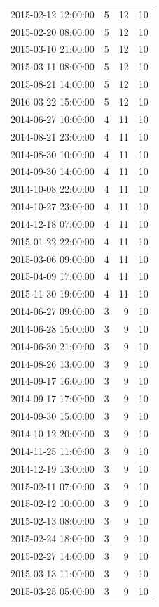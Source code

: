 \begin{tabular}{lrrr}
2015-02-12 12:00:00 & 5 & 12 & 10 \\
2015-02-20 08:00:00 & 5 & 12 & 10 \\
2015-03-10 21:00:00 & 5 & 12 & 10 \\
2015-03-11 08:00:00 & 5 & 12 & 10 \\
2015-08-21 14:00:00 & 5 & 12 & 10 \\
2016-03-22 15:00:00 & 5 & 12 & 10 \\
2014-06-27 10:00:00 & 4 & 11 & 10 \\
2014-08-21 23:00:00 & 4 & 11 & 10 \\
2014-08-30 10:00:00 & 4 & 11 & 10 \\
2014-09-30 14:00:00 & 4 & 11 & 10 \\
2014-10-08 22:00:00 & 4 & 11 & 10 \\
2014-10-27 23:00:00 & 4 & 11 & 10 \\
2014-12-18 07:00:00 & 4 & 11 & 10 \\
2015-01-22 22:00:00 & 4 & 11 & 10 \\
2015-03-06 09:00:00 & 4 & 11 & 10 \\
2015-04-09 17:00:00 & 4 & 11 & 10 \\
2015-11-30 19:00:00 & 4 & 11 & 10 \\
2014-06-27 09:00:00 & 3 & 9 & 10 \\
2014-06-28 15:00:00 & 3 & 9 & 10 \\
2014-06-30 21:00:00 & 3 & 9 & 10 \\
2014-08-26 13:00:00 & 3 & 9 & 10 \\
2014-09-17 16:00:00 & 3 & 9 & 10 \\
2014-09-17 17:00:00 & 3 & 9 & 10 \\
2014-09-30 15:00:00 & 3 & 9 & 10 \\
2014-10-12 20:00:00 & 3 & 9 & 10 \\
2014-11-25 11:00:00 & 3 & 9 & 10 \\
2014-12-19 13:00:00 & 3 & 9 & 10 \\
2015-02-11 07:00:00 & 3 & 9 & 10 \\
2015-02-12 10:00:00 & 3 & 9 & 10 \\
2015-02-13 08:00:00 & 3 & 9 & 10 \\
2015-02-24 18:00:00 & 3 & 9 & 10 \\
2015-02-27 14:00:00 & 3 & 9 & 10 \\
2015-03-13 11:00:00 & 3 & 9 & 10 \\
2015-03-25 05:00:00 & 3 & 9 & 10 \\

\end{tabular}
